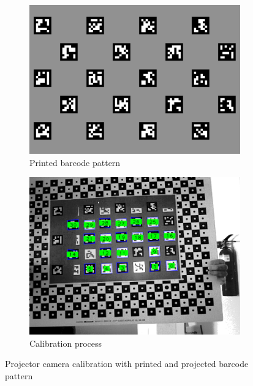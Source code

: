 \begin{figure}[htbp]
        \centering
        \begin{subfigure}[b]{0.486\textwidth}
                \includegraphics[width=\textwidth]{images/software/barcode.png}
                \caption{Printed barcode pattern}
                \label{img:patternCalib}
        \end{subfigure}
    \hfill
        \begin{subfigure}[b]{0.46\textwidth}
                \includegraphics[width=\textwidth]{images/software/calib.png}
                \caption{Calibration process}
                \label{img:calibCam}
        \end{subfigure}        
        \caption{Projector camera calibration with printed and projected barcode pattern}
        \label{img:calibrationproces}
\end{figure}
